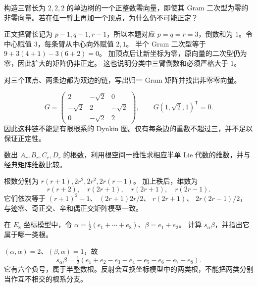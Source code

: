 \begin{exercise}\label{b5:ex:17-three-arm-obstruction}
	构造三臂长为 \(2,2,2\) 的单边树的一个正整数零向量，即使其 Gram 二次型为零的非零向量。若在任一臂上再加一个顶点，为什么仍不可能正定？
\end{exercise}
\begin{solution}
	正文把臂长记为 \(p-1,q-1,r-1\)，所以本题对应 \(p=q=r=3\)，倒数和为 \(1\)。令中心赋值 \(3\)，每条臂从中心向外赋值 \(2,1\)。 半个 Gram 二次型等于 \(9+3(4+1)-3(6+2)=0\)。 加顶点后让新坐标为零，原向量的二次型仍为零，因此扩大的矩阵仍非正定。 这也说明分类中三臂倒数和必须严格大于 \(1\)。
\end{solution}

\begin{exercise}\label{b5:ex:17-two-double-obstruction}
	对三个顶点、两条边都为双边的链，写出归一 Gram 矩阵并找出非零零向量。
\end{exercise}
\begin{solution}
	\[
		G=\begin{pmatrix}2&-\sqrt2&0\\-\sqrt2&2&-\sqrt2\\0&-\sqrt2&2\end{pmatrix},
		\qquad G(1,\sqrt2,1)^{\mathsf T}=0.
	\]
	因此这种链不能是有限根系的 Dynkin 图。仅有每条边的重数不超过三，并不足以保证正定性。
\end{solution}

\begin{exercise}\label{b5:ex:17-classical-count}
	数出 \(A_r,B_r,C_r,D_r\) 的根数，利用根空间一维性求相应半单 Lie 代数的维数，并与经典矩阵维数比较。
\end{exercise}
\begin{solution}
	根数分别为 \(r(r+1),2r^2,2r^2,2r(r-1)\)。 加上秩后，维数为
	\[
		r(r+2),\quad r(2r+1),\quad r(2r+1),\quad r(2r-1).
	\]
	它们依次等于 \((r+1)^2-1\)、 \((2r+1)2r/2\)、 \(r(2r+1)\)、 \(2r(2r-1)/2\)，与迹零、奇正交、辛和偶正交矩阵模型一致。
\end{solution}

\begin{exercise}\label{b5:ex:17-e8-reflection}
	在 \(E_8\) 坐标模型中，令 \(\alpha=\tfrac12(e_1+\cdots+e_8)\)、\(\beta=e_1+e_2\)。 计算 \(s_\alpha\beta\)，并指出它属于哪一类根。
\end{exercise}
\begin{solution}
	\((\alpha,\alpha)=2\)、\((\beta,\alpha)=1\)，故
	\[
		s_\alpha\beta =\tfrac12(e_1+e_2-e_3-e_4-e_5-e_6-e_7-e_8).
	\]
	它有六个负号，属于半整数根。反射会互换坐标模型中的两类根，不能把两类分别当作互不相交的根系分支。
\end{solution}

